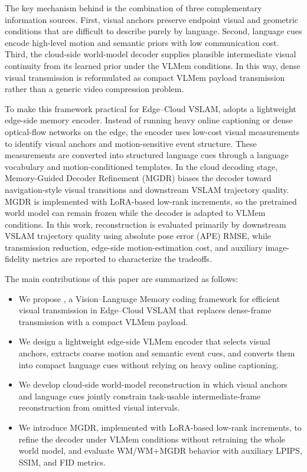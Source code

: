 The key mechanism behind \VLMemCodec{} is the combination of three complementary information sources. First, visual anchors preserve endpoint visual and geometric conditions that are difficult to describe purely by language. Second, language cues encode high-level motion and semantic priors with low communication cost. Third, the cloud-side world-model decoder supplies plausible intermediate visual continuity from its learned prior under the VLMem conditions. In this way, dense visual transmission is reformulated as compact VLMem payload transmission rather than a generic video compression problem.

To make this framework practical for Edge--Cloud VSLAM, \VLMemCodec{} adopts a lightweight edge-side memory encoder. Instead of running heavy online captioning or dense optical-flow networks on the edge, the encoder uses low-cost visual measurements to identify visual anchors and motion-sensitive event structure. These measurements are converted into structured language cues through a language vocabulary and motion-conditioned templates. In the cloud decoding stage, Memory-Guided Decoder Refinement (MGDR) biases the decoder toward navigation-style visual transitions and downstream VSLAM trajectory quality. MGDR is implemented with LoRA-based low-rank increments, so the pretrained world model can remain frozen while the decoder is adapted to VLMem conditions. In this work, reconstruction is evaluated primarily by downstream VSLAM trajectory quality using absolute pose error (APE) RMSE, while transmission reduction, edge-side motion-estimation cost, and auxiliary image-fidelity metrics are reported to characterize the tradeoffs.

The main contributions of this paper are summarized as follows:
\begin{itemize}
    \item We propose \VLMemCodec, a Vision--Language Memory coding framework for efficient visual transmission in Edge--Cloud VSLAM that replaces dense-frame transmission with a compact VLMem payload.
    \item We design a lightweight edge-side VLMem encoder that selects visual anchors, extracts coarse motion and semantic event cues, and converts them into compact language cues without relying on heavy online captioning.
    \item We develop cloud-side world-model reconstruction in which visual anchors and language cues jointly constrain task-usable intermediate-frame reconstruction from omitted visual intervals.
    \item We introduce MGDR, implemented with LoRA-based low-rank increments, to refine the decoder under VLMem conditions without retraining the whole world model, and evaluate WM/WM+MGDR behavior with auxiliary LPIPS, SSIM, and FID metrics.
\end{itemize}

